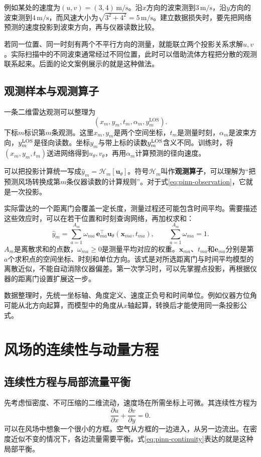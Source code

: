 例如某处的速度为$(u,v)=(3,4)\,\mathrm{m/s}$。沿$x$方向的波束测到$3\,\mathrm{m/s}$，沿$y$方向的波束测到$4\,\mathrm{m/s}$，而风速大小为$\sqrt{3^2+4^2}=5\,\mathrm{m/s}$。建立数据损失时，要先把网络预测的速度投影到波束方向，再与仪器读数比较。

若同一位置、同一时刻有两个不平行方向的测量，就能联立两个投影关系求解$u,v$。实际扫描中的不同波束通常经过不同位置，此时可以借助流体方程把分散的观测联系起来。后面的论文案例展示的就是这种做法。

\subsection{观测样本与观测算子}
一条二维雷达观测可以整理为
\[
 (x_m,y_m,t_m,\alpha_m,y_m^{\mathrm{LOS}}).
\]
下标$m$标识第$m$条观测。这里$x_m,y_m$是两个空间坐标，$t_m$是测量时刻，$\alpha_m$是波束方向，$y_m^{\rm LOS}$是径向读数。坐标$y_m$与带上标的读数$y_m^{\rm LOS}$含义不同。训练时，将$(x_m,y_m,t_m)$送进网络得到$u_\theta,v_\theta$，再用$\alpha_m$计算预测的径向速度。

可以把投影计算统一写成$\widehat y_m=\mathcal H_m[\mathbf u_\theta]$。符号$\mathcal H_m$叫作\textbf{观测算子}，可以理解为“把预测风场转换成第$m$条仪器读数的计算规则”。对于式\eqref{eq:pinn-observation}，它就是一次投影。

实际雷达的一个距离门会覆盖一定长度，测量过程还可能包含时间平均。需要描述这些效应时，可以在若干位置和时刻查询网络，再加权求和：
\begin{equation}
 \widehat y_m=\sum_{a=1}^{A_m}\omega_{ma}\,
 \mathbf e_{ma}^{\top}\mathbf u_\theta(\mathbf x_{ma},t_{ma}),
 \qquad \sum_{a=1}^{A_m}\omega_{ma}=1.
\end{equation}
$A_m$是离散求和的点数，$\omega_{ma}\geq0$是测量平均对应的权重。$\mathbf x_{ma}$、$t_{ma}$和$\mathbf e_{ma}$分别是第$a$个求积点的空间坐标、时刻和单位方向。该式是对所选距离门与时间平均模型的离散近似，不能自动消除仪器偏差。第一次学习时，可以先掌握点投影，再根据仪器的距离门设置扩展这一步\cite{sathe2013lidar}。

数据整理时，先统一坐标轴、角度定义、速度正负号和时间单位。例如仪器方位角可能从北方向起算，而模型中的角度从$x$轴起算，转换后才能使用同一条投影公式。

\section{风场的连续性与动量方程}
\label{sec:pinn-physics}

\subsection{连续性方程与局部流量平衡}
先考虑恒密度、不可压缩的二维流动，速度场在所需坐标上可微。其连续性方程为
\begin{equation}
 \frac{\partial u}{\partial x}+\frac{\partial v}{\partial y}=0.
 \label{eq:pinn-continuity}
\end{equation}
可以在风场中想象一个很小的方框。空气从方框的一边进入，从另一边流出。在密度近似不变的情况下，各边流量需要平衡。式\eqref{eq:pinn-continuity}表达的就是这种局部平衡。

